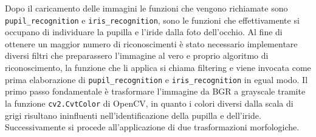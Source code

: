 Dopo il caricamento delle immagini le funzioni che vengono richiamate sono \texttt{pupil\_recognition} e \texttt{iris\_recognition}, sono le funzioni che effettivamente si occupano di individuare la pupilla e l’iride dalla foto dell’occhio. Al fine di ottenere un maggior numero di riconoscimenti è stato necessario implementare diversi filtri che preparassero l’immagine al vero e proprio algoritmo di riconoscimento, la funzione che li applica si chiama filtering e viene invocata come prima elaborazione di \texttt{pupil\_recognition} e \texttt{iris\_recognition} in egual modo. Il primo passo fondamentale è  trasformare l’immagine da BGR a grayscale tramite la funzione \texttt{cv2.CvtColor} di OpenCV, in quanto i colori diversi dalla scala di grigi risultano ininfluenti nell’identificazione della pupilla e dell’iride. Successivamente si procede all’applicazione di due trasformazioni morfologiche. 
